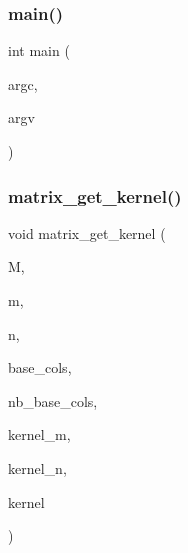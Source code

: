 \mbox{\label{burnside_8_c_a3c04138a5bfe5d72780bb7e82a18e627}} 
\subsubsection{\texorpdfstring{main()}{main()}}
{\footnotesize\ttfamily int main (\begin{DoxyParamCaption}\item[{int}]{argc,  }\item[{char $\ast$$\ast$}]{argv }\end{DoxyParamCaption})}

\mbox{\label{burnside_8_c_a9cbadde1532d59b0e31bf016f74d0ad0}} 
\subsubsection{\texorpdfstring{matrix\+\_\+get\+\_\+kernel()}{matrix\_get\_kernel()}}
{\footnotesize\ttfamily void matrix\+\_\+get\+\_\+kernel (\begin{DoxyParamCaption}\item[{double $\ast$}]{M,  }\item[{\mbox{\hyperlink{galois_8h_a09fddde158a3a20bd2dcadb609de11dc}{I\+NT}}}]{m,  }\item[{\mbox{\hyperlink{galois_8h_a09fddde158a3a20bd2dcadb609de11dc}{I\+NT}}}]{n,  }\item[{\mbox{\hyperlink{galois_8h_a09fddde158a3a20bd2dcadb609de11dc}{I\+NT}} $\ast$}]{base\+\_\+cols,  }\item[{\mbox{\hyperlink{galois_8h_a09fddde158a3a20bd2dcadb609de11dc}{I\+NT}}}]{nb\+\_\+base\+\_\+cols,  }\item[{\mbox{\hyperlink{galois_8h_a09fddde158a3a20bd2dcadb609de11dc}{I\+NT}} \&}]{kernel\+\_\+m,  }\item[{\mbox{\hyperlink{galois_8h_a09fddde158a3a20bd2dcadb609de11dc}{I\+NT}} \&}]{kernel\+\_\+n,  }\item[{double $\ast$}]{kernel }\end{DoxyParamCaption})}

\mbox{\label{burnside_8_c_ae23ebcde3a42e840df718b18b33a073b}} 
